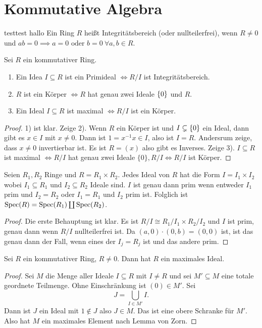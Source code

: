 \section{Kommutative Algebra}

\begin{Def}
testtest hallo
    Ein Ring \(R\) heißt Integritätsbereich (oder nullteilerfrei), wenn \(R\neq 0\) und \(ab=0\implies a=0 \text{ oder } b=0 \ \forall a,b\in R.\)
\end{Def}
\begin{Lemma} Sei \(R\) ein kommutativer Ring.
\begin{enumerate}
    \item Ein Idea \(I\subseteq R\) ist ein Primideal \(\iff R/I\) ist Integritätsbereich.
    \item \(R\) ist ein Körper \(\iff R\) hat genau zwei Ideale \(\{0\}\) und \(R\).
    \item Ein Ideal \(I\subseteq R\) ist maximal \(\iff R/I\) ist ein Körper.
\end{enumerate}
\begin{proof}
    1) ist klar.
    Zeige 2). Wenn \(R\) ein Körper ist und \(I\subsetneq \{0\}\) ein Ideal, dann gibt es \(x\in I\) mit \(x\neq 0\). Dann ist \(1=x^{-1}x\in I\), also ist \(I=R\). Andersrum zeige, dass \(x\neq 0\) invertierbar ist. Es ist \(R=(x)\) also gibt es Inverses.
    Zeige 3). \(I\subseteq R\) ist maximal \(\iff R/I\) hat genau zwei Ideale \(\{0\}, R/I \iff R/I\) ist Körper.
\end{proof}
\begin{Lemma}\label{Lem:IdealeProduktring}
    Seien \(R_1,R_2\) Ringe und \(R=R_1\times R_2\). Jedes Ideal von \(R\) hat die Form \(I=I_1\times I_2\) wobei \(I_1\subseteq R_1\) und \(I_2\subseteq R_2\) Ideale sind. \(I\) ist genau dann prim wenn entweder \(I_1\) prim und \(I_2=R_2\) oder \(I_1=R_1\) und \(I_2\) prim ist.
    Folglich ist \(\operatorname{Spec}(R)=\operatorname{Spec}(R_1)\coprod \operatorname{Spec}(R_2)\).
\end{Lemma}
\begin{proof}
    Die erste Behauptung ist klar. Es ist \(R/I\cong R_1/I_1\times R_2/I_2\) und \(I\) ist prim, genau dann wenn \(R/I\) nullteilerfrei ist.
    Da \((a,0)\cdot (0,b)=(0,0)\) ist, ist das genau dann der Fall, wenn eines der \(I_j=R_j\) ist und das andere prim.
\end{proof}

\begin{Satz}\label{Satz:ExMaxId}
    Sei \(R\) ein kommutativer Ring, \(R\neq 0\). Dann hat \(R\) ein maximales Ideal.
\end{Satz}
\begin{proof}
    Sei \(M\) die Menge aller Ideale \(I\subseteq R\) mit \(I\neq R\) und sei \(M'\subseteq M\) eine totale geordnete Teilmenge.  Ohne Einschränkung ist \((0)\in M'\). Sei \[J=\bigcup\limits_{I\in M'}I.\] Dann ist \(J\) ein Ideal mit \(1\not\in J\) also \(J\in M\). Das ist eine obere Schranke für \(M'\). Also hat \(M\) ein maximales Element nach Lemma von Zorn.
\end{proof}
\end{Lemma}
